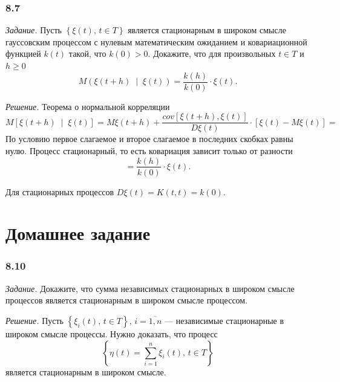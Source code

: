 \subsubsection*{8.7}

\textit{Задание.}
Пусть $ \left\{ \xi \left( t \right), \, t \in T \right\} $
является стационарным в широком смысле гауссовским процессом с нулевым математическим ожиданием и
ковариационной функцией $k \left( t \right) $ такой, что $k \left( 0 \right)> 0$.
Докажите, что для произвольных $t \in T$ и $h \geq 0$
\begin{equation*}
  M \left( \xi \left( t + h \right) \; \middle| \; \xi \left( t \right) \right) =
  \frac{k \left( h \right) }{k \left( 0 \right) } \cdot \xi \left( t \right).
\end{equation*}

\textit{Решение.}
Теорема о нормальной корреляции
\begin{equation*}
  M \left[ \xi \left( t + h \right) \; \middle| \; \xi \left( t \right) \right] =
  M \xi \left( t + h \right) +
  \frac{cov \left[ \xi \left( t + h \right), \xi \left( t \right) \right] }{D \xi \left( t \right) }
  \cdot \left[ \xi \left( t \right) - M \xi \left( t \right) \right] =
\end{equation*}
По условию первое слагаемое и второе слагаемое в последних скобках равны нулю.
Процесс стационарный, то есть ковариация зависит только от разности
\begin{equation*}
  = \frac{k \left( h \right) }{k \left( 0 \right) } \cdot \xi \left( t \right).
\end{equation*}

Для стационарных процессов $D \xi \left( t \right) = K \left( t, t \right) = k \left( 0 \right) $.

\section*{Домашнее задание}

\subsubsection*{8.10}

\textit{Задание.}
Докажите, что сумма независимых стационарных в широком смысле процессов является стационарным в
широком смысле процессом.

\textit{Решение.}
Пусть $ \left\{ \xi_i \left( t \right), \, t \in T \right\}, \, i = \overline{1, n}$ ---
независимые стационарные в широком смысле процессы.
Нужно доказать, что процесс
$$ \left\{
  \eta \left( t \right) = \sum \limits_{i = 1}^n \xi_i \left( t \right), \, t \in T \right\} $$
является стационарным в широком смысле.

